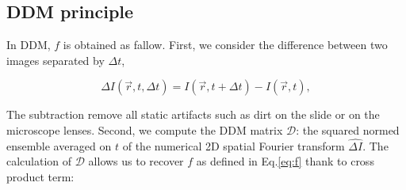 \documentclass[prb,twocolumn,amsmath,amssymb]{revtex4-1}
\newcommand{\tgn}[1]{{\color{blue}#1}} %
\begin{document}
{%


\subsection{DDM principle}

In DDM, $f$ is obtained as fallow. First, we consider the difference between two images separated by $\Delta t$,

\begin{equation}
\Delta I(\vec{r},t, \Delta t) = I(\vec{r}, t+\Delta t) - I(\vec{r}, t),
\label{eq:DI}
\end{equation}

The subtraction remove all static artifacts such as dirt on the slide or on the microscope lenses. Second, we compute the DDM matrix $\mathcal{D}$: the squared normed  ensemble averaged on $t$ of the numerical 2D spatial Fourier transform $\widehat{\Delta I}$. The calculation of $\mathcal{D}$ allows us to recover $f$ as defined in Eq.\eqref{eq:f} thank to cross product term:

}
\end{document}

